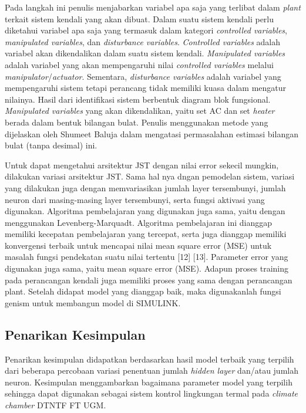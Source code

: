 Pada langkah ini penulis menjabarkan variabel apa saja yang terlibat dalam \textit{plant} terkait sistem kendali yang akan dibuat. Dalam suatu sistem kendali perlu diketahui variabel apa saja yang termasuk dalam kategori \textit{controlled variables}, \textit{manipulated variables}, dan \textit{disturbance variables}. \textit{Controlled variables} adalah variabel akan dikendalikan dalam suatu sistem kendali. \textit{Manipulated variables} adalah variabel yang akan mempengaruhi nilai \textit{controlled variables} melalui \textit{manipulator}/\textit{actuator}. Sementara, \textit{disturbance variables} adalah variabel yang mempengaruhi sistem tetapi perancang tidak memiliki kuasa dalam mengatur nilainya. Hasil dari identifikasi sistem berbentuk diagram blok fungsional. \textit{Manipulated variables} yang akan dikendalikan, yaitu set AC dan set \textit{heater} berada dalam bentuk bilangan bulat. Penulis menggunakan metode yang dijelaskan oleh Shumeet Baluja dalam mengatasi permasalahan estimasi bilangan bulat (tanpa desimal) ini\cite{article26}.

Untuk dapat mengetahui arsitektur JST dengan nilai error sekecil mungkin, dilakukan variasi arsitektur JST. Sama hal nya dngan pemodelan sistem, variasi yang dilakukan juga dengan memvariasikan jumlah layer tersembunyi, jumlah neuron dari masing-masing layer tersembunyi, serta fungsi aktivasi yang digunakan. Algoritma pembelajaran yang digunakan juga sama, yaitu dengan menggunakan Levenberg-Marquadt. Algoritma pembelajaran ini dianggap memiliki kecepatan pembelajaran yang tercepat, serta juga dianggap memiliki konvergensi terbaik untuk mencapai nilai mean square error (MSE) untuk masalah fungsi pendekatan suatu nilai tertentu [12] [13]. Parameter error yang digunakan juga sama, yaitu mean square error (MSE). Adapun proses training pada perancangan kendali juga memiliki proses yang sama dengan perancangan plant. Setelah didapat model yang dianggap baik, maka digunakanlah fungsi genism untuk membangun model di SIMULINK.

\subsection{{Penarikan Kesimpulan}}
Penarikan kesimpulan didapatkan berdasarkan hasil model terbaik yang terpilih dari beberapa percobaan variasi penentuan jumlah \textit{hidden layer} dan/atau jumlah neuron. Kesimpulan menggambarkan bagaimana parameter model yang terpilih sehingga dapat digunakan sebagai sistem kontrol lingkungan termal pada \textit{climate chamber} DTNTF FT UGM.

